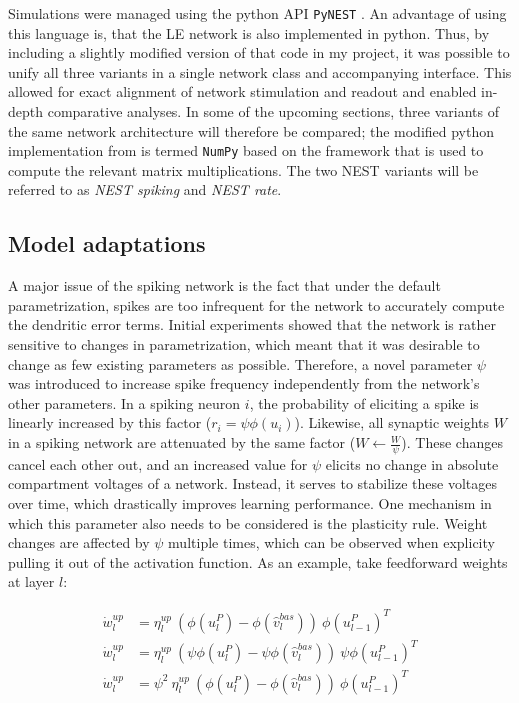Simulations were managed using the python API \texttt{PyNEST} \citep{Eppler2009}. An advantage of using this language
is, that the LE network  is also implemented in python. Thus, by including a slightly modified version of that code in
my project, it was possible to unify all three variants in a single network class and accompanying interface. This
allowed for exact alignment of network stimulation and readout and enabled in-depth comparative analyses. In some of the
upcoming sections, three variants of the same network architecture will therefore be compared; the modified python
implementation from \citep{Haider2021} is termed \texttt{NumPy} based on the framework that is used to compute the
relevant matrix multiplications. The two NEST variants will be referred to as
\textit{NEST spiking} and \textit{NEST rate}.

\subsection{Model adaptations}

A major issue of the spiking network is the fact that under the default parametrization, spikes are too infrequent for
the network to accurately compute the dendritic error terms. Initial experiments showed that the network is rather
sensitive to changes in parametrization, which meant that it was desirable to change as few existing parameters as
possible. Therefore, a novel parameter $\psi$ was introduced to increase spike frequency independently from the
network's other parameters. In a spiking neuron $i$, the probability of eliciting a spike is linearly increased by this
factor ($r_i = \psi \phi(u_i)$). Likewise, all synaptic weights $W$ in a spiking network are attenuated by the same
factor ($W \leftarrow \frac{W}{\psi}$). These changes cancel each other out, and an increased value for $\psi$ elicits
no change in absolute compartment voltages of a network. Instead, it serves to stabilize these voltages over time, which
drastically improves learning performance. One mechanism in which this parameter also needs to be considered is the
plasticity rule. Weight changes are affected by $\psi$ multiple times, which can be observed when explicity pulling it
out of the activation function. As an example, take feedforward weights at layer $l$:

\begin{align*}
  \dot{w}_{l}^{up}   & = \eta_l^{up} \ ( \phi(u_l^{P}) - \phi(\hat{v}_l^{bas}) ) \ \phi(u_{l-1}^{P})^T\\
  \dot{w}_{l}^{up}   & = \eta_l^{up} \ ( \psi\phi(u_l^{P}) - \psi\phi(\hat{v}_l^{bas}) ) \ \psi\phi(u_{l-1}^{P})^T\\
  \dot{w}_{l}^{up}   & = \psi^2 \ \eta_l^{up} \ (\phi(u_l^{P}) - \phi(\hat{v}_l^{bas}) ) \ \phi(u_{l-1}^{P})^T
\end{align*}

